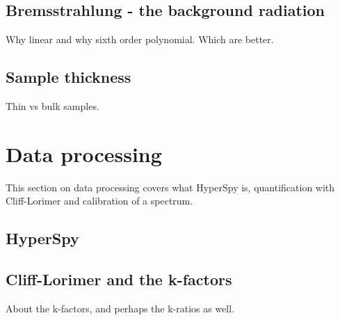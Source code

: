 




%
%
\subsection{Bremsstrahlung - the background radiation}
\label{sec:theory:empirical:background}
Why linear and why sixth order polynomial. Which are better.




\subsection{Sample thickness}
\label{sec:theory:empirical:samplethickness}
Thin vs bulk samples.








\section{Data processing}
\label{sec:theory:data}

This section on data processing covers what HyperSpy is, quantification with Cliff-Lorimer and calibration of a spectrum.


\subsection{HyperSpy}
\label{sec:theory:data:hyperspy}





%
% 
\subsection{Cliff-Lorimer and the k-factors}
\label{sec:theory:empirical:kfactors}
About the k-factors, and perhaps the k-ratios as well.

